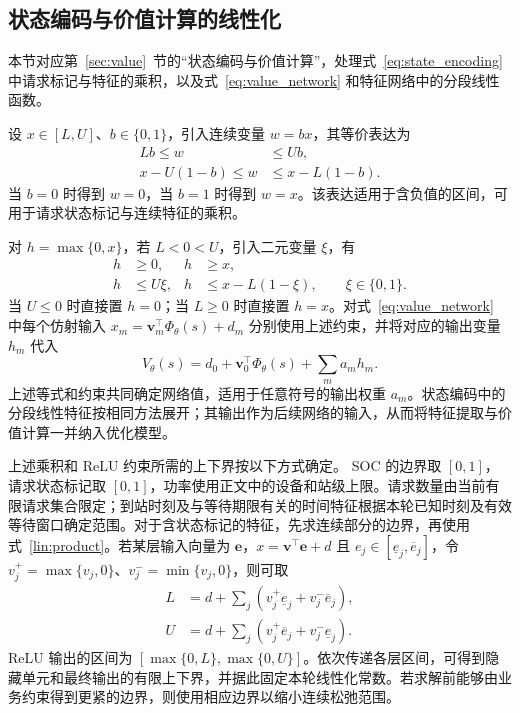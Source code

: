 \subsection{状态编码与价值计算的线性化}
\label{lin:value_computation_section}
本节对应第~\ref{sec:value}~节的“状态编码与价值计算”，处理式~\eqref{eq:state_encoding} 中请求标记与特征的乘积，以及式~\eqref{eq:value_network} 和特征网络中的分段线性函数。

设 $x\in[L,U]$、$b\in\{0,1\}$，引入连续变量 $w=bx$，其等价表达为
\begin{equation}
\begin{aligned}
Lb\le w&\le Ub,\\
x-U(1-b)\le w&\le x-L(1-b).
\end{aligned}
\label{lin:product}
\end{equation}
当 $b=0$ 时得到 $w=0$，当 $b=1$ 时得到 $w=x$。该表达适用于含负值的区间，可用于请求状态标记与连续特征的乘积。

对 $h=\max\{0,x\}$，若 $L<0<U$，引入二元变量 $\xi$，有
\begin{equation}
\begin{aligned}
h&\ge 0, & h&\ge x,\\
h&\le U\xi, & h&\le x-L(1-\xi),
\qquad \xi\in\{0,1\}.
\end{aligned}
\label{lin:relu}
\end{equation}
当 $U\le0$ 时直接置 $h=0$；当 $L\ge0$ 时直接置 $h=x$。对式~\eqref{eq:value_network} 中每个仿射输入 $x_m=\boldsymbol v_m^\top\Phi_\theta(s)+d_m$ 分别使用上述约束，并将对应的输出变量 $h_m$ 代入
\begin{equation}
V_\theta(s)=d_0+\boldsymbol v_0^\top\Phi_\theta(s)+\sum_m a_m h_m.
\label{lin:network}
\end{equation}
上述等式和约束共同确定网络值，适用于任意符号的输出权重 $a_m$。状态编码中的分段线性特征按相同方法展开；其输出作为后续网络的输入，从而将特征提取与价值计算一并纳入优化模型。

上述乘积和 ReLU 约束所需的上下界按以下方式确定。
SOC 的边界取 $[0,1]$，请求状态标记取 $[0,1]$，功率使用正文中的设备和站级上限。请求数量由当前有限请求集合限定；到站时刻及与等待期限有关的时间特征根据本轮已知时刻及有效等待窗口确定范围。对于含状态标记的特征，先求连续部分的边界，再使用式~\eqref{lin:product}。若某层输入向量为 $\boldsymbol e$，$x=\boldsymbol v^\top\boldsymbol e+d$ 且 $e_j\in[\underline e_j,\overline e_j]$，令 $v_j^+=\max\{v_j,0\}$、$v_j^-=\min\{v_j,0\}$，则可取
\begin{equation}
\begin{aligned}
L&=d+\sum_j\left(v_j^+\underline e_j+v_j^-\overline e_j\right),\\
U&=d+\sum_j\left(v_j^+\overline e_j+v_j^-\underline e_j\right).
\end{aligned}
\label{lin:interval}
\end{equation}
ReLU 输出的区间为 $[\max\{0,L\},\max\{0,U\}]$。依次传递各层区间，可得到隐藏单元和最终输出的有限上下界，并据此固定本轮线性化常数。若求解前能够由业务约束得到更紧的边界，则使用相应边界以缩小连续松弛范围。

